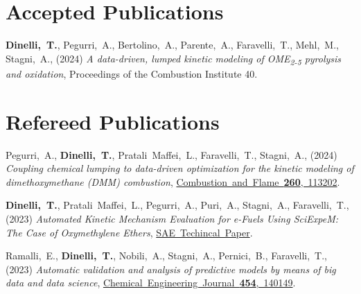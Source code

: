 \ifshowacceptedpubs
\section{\sc Accepted Publications}
   \begin{etaremune}[start=\value{pubCounter}]
      \item
         {\bf Dinelli,~T.},
         Pegurri,~A.,
         Bertolino,~A.,
         Parente,~A.,
         Faravelli,~T.,
         Mehl,~M.,
         Stagni,~A.,
         (2024)
         {\it A data-driven, lumped kinetic modeling of OME\textsubscript{2-5} pyrolysis and oxidation},
         {Proceedings of the Combustion Institute 40}.
   \end{etaremune}
\else %
\fi

\section{\sc Refereed Publications}
   \addtocounter{pubCounter}{-2}
   \begin{etaremune}[start=\value{pubCounter}]
      \item
         Pegurri,~A.,
         {\bf Dinelli,~T.},
         Pratali~Maffei,~L.,
         Faravelli,~T.,
         Stagni,~A.,
         (2024)
         {\it Coupling chemical lumping to data-driven optimization for the kinetic modeling of dimethoxymethane (DMM) combustion},
         \href{https://doi.org/10.1016/j.combustflame.2023.113202}
         {Combustion~and~Flame~{\bf 260},~113202}.

      \item
         {\bf Dinelli,~T.},
         Pratali~Maffei,~L.,
         Pegurri,~A.,
         Puri,~A.,
         Stagni,~A.,
         Faravelli,~T.,
         (2023)
         {\it Automated Kinetic Mechanism Evaluation for e-Fuels Using SciExpeM: The Case of Oxymethylene Ethers},
         \href{https://doi.org/10.4271/2023-24-0092}
         {SAE~Techincal~Paper}.

      \item
         Ramalli,~E.,
         {\bf Dinelli,~T.},
         Nobili,~A.,
         Stagni,~A.,
         Pernici,~B.,
         Faravelli,~T.,
         (2023)
         {\it Automatic validation and analysis of predictive models by means of big data and data science},
         \href{https://doi.org/10.1016/j.cej.2022.140149}
         {Chemical~Engineering~Journal~{\bf 454},~140149}.
      \setcounter{pubCounter}{\value{enumi}}
   \end{etaremune}
